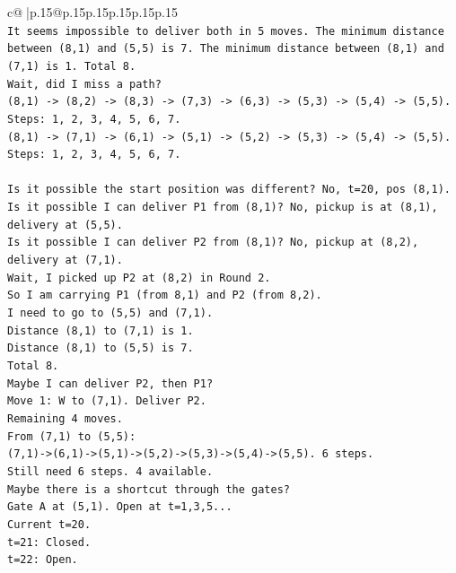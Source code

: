 \documentclass{article}
\begin{document}
{\begin{supertabular}{c@{$\;$}|p{.15\linewidth}@{}p{.15\linewidth}p{.15\linewidth}p{.15\linewidth}p{.15\linewidth}p{.15\linewidth}}
{{{\\ 
\texttt{It seems impossible to deliver both in 5 moves. The minimum distance between (8,1) and (5,5) is 7. The minimum distance between (8,1) and (7,1) is 1. Total 8.} \\
\texttt{Wait, did I miss a path?} \\
\texttt{(8,1) {-}> (8,2) {-}> (8,3) {-}> (7,3) {-}> (6,3) {-}> (5,3) {-}> (5,4) {-}> (5,5).} \\
\texttt{Steps: 1, 2, 3, 4, 5, 6, 7.} \\
\texttt{(8,1) {-}> (7,1) {-}> (6,1) {-}> (5,1) {-}> (5,2) {-}> (5,3) {-}> (5,4) {-}> (5,5).} \\
\texttt{Steps: 1, 2, 3, 4, 5, 6, 7.} \\
\\ 
\texttt{Is it possible the start position was different? No, t=20, pos (8,1).} \\
\texttt{Is it possible I can deliver P1 from (8,1)? No, pickup is at (8,1), delivery at (5,5).} \\
\texttt{Is it possible I can deliver P2 from (8,1)? No, pickup at (8,2), delivery at (7,1).} \\
\texttt{Wait, I picked up P2 at (8,2) in Round 2.} \\
\texttt{So I am carrying P1 (from 8,1) and P2 (from 8,2).} \\
\texttt{I need to go to (5,5) and (7,1).} \\
\texttt{Distance (8,1) to (7,1) is 1.} \\
\texttt{Distance (8,1) to (5,5) is 7.} \\
\texttt{Total 8.} \\
\texttt{Maybe I can deliver P2, then P1?} \\
\texttt{Move 1: W to (7,1). Deliver P2.} \\
\texttt{Remaining 4 moves.} \\
\texttt{From (7,1) to (5,5):} \\
\texttt{(7,1){-}>(6,1){-}>(5,1){-}>(5,2){-}>(5,3){-}>(5,4){-}>(5,5). 6 steps.} \\
\texttt{Still need 6 steps. 4 available.} \\
\texttt{Maybe there is a shortcut through the gates?} \\
\texttt{Gate A at (5,1). Open at t=1,3,5...} \\
\texttt{Current t=20.} \\
\texttt{t=21: Closed.} \\
\texttt{t=22: Open.} \\
}}}
\end{supertabular}}
\end{document}
